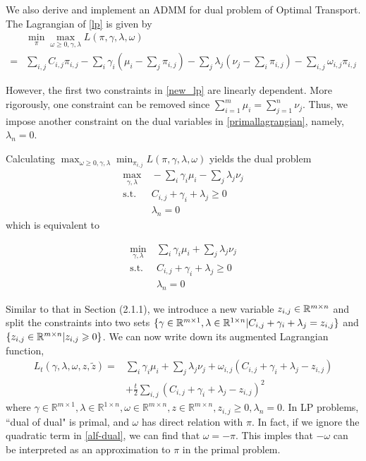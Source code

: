 \documentclass[english]{pkupaper}
\newenvironment{eqt}{\begin{equation}\begin{aligned}}{\end{aligned}\end{equation}}
\begin{document}
We also derive and implement an ADMM for dual problem of Optimal Transport. The Lagrangian of \ref{lp} is given by
\begin{eqt}
&\min_{\pi}\max_{\omega\geqslant 0, \gamma, \lambda}L(\pi, \gamma, \lambda, \omega) \\
= &  \sum_{i, j}C_{i,j}\pi_{i,j} - \sum_i\gamma_i(\mu_i-\sum_{j}\pi_{i,j}) - \sum_j\lambda_j(\nu_j-\sum_i\pi_{i,j}) - \sum_{i, j}\omega_{i,j}\pi_{i,j}\label{primallagrangian}
\end{eqt} 

However, the first two constraints in \ref{new_lp} are linearly dependent. More rigorously, one constraint can be removed since $\sum_{i=1}^m\mu_i = \sum_{j=1}^n\nu_j$. Thus, we impose another constraint on the dual variables in \ref{primallagrangian}, namely, $\lambda_n=0$. 

Calculating $\max_{\omega\geqslant 0, \gamma, \lambda}\min_{\pi_{i, j}}L(\pi, \gamma, \lambda, \omega)$ yields the dual problem
\begin{eqt}
\max_{\gamma, \lambda}&\ -\sum_i\gamma_i\mu_i - \sum_j\lambda_j\nu_j \\
\text{s.t.}&\ C_{i, j}+\gamma_i+\lambda_j\geqslant 0 \\
&\ \lambda_{n} = 0 \label{dual}
\end{eqt}
which is equivalent to 

\begin{eqt}
\min_{\gamma, \lambda}&\ \sum_i\gamma_i\mu_i + \sum_j\lambda_j\nu_j \\
\text{s.t.}&\ C_{i, j}+\gamma_i+\lambda_j\geqslant 0 \\
&\ \lambda_n=0 \label{dual2}
\end{eqt}

Similar to that in Section (2.1.1), we introduce a new variable $ z_{i, j} \in \mathbb{R}^{m\times n}$ and split the constraints into two sets $\{\gamma\in \mathbb{R}^{m\times 1}, \lambda\in \mathbb{R}^{1\times n}| C_{i, j}+\gamma_i+\lambda_j=z_{i, j}\}$ and $\{z_{i, j}\in \mathbb{R}^{m\times n}|z_{i, j}\geqslant0\}$. We can now write down its augmented Lagrangian function,
\begin{eqt}
L_t(\gamma, \lambda, \omega, z, \tilde z) = &\sum_i\gamma_i\mu_i + \sum_j\lambda_j\nu_j + \omega_{i, j}(C_{i, j}+\gamma_i+\lambda_j-z_{i, j}) \\&+ \frac{t}{2}\sum_{i, j}(C_{i, j}+\gamma_i+\lambda_j-z_{i, j})^2
\label{alf-dual}
\end{eqt}
where $\gamma\in\mathbb{R}^{m\times 1}, \lambda\in\mathbb{R}^{1\times n}, \omega\in\mathbb{R}^{m\times n}, z\in\mathbb{R}^{m\times n}, z_{i,j}\geqslant 0, \lambda_n=0$. In LP problems, ``dual of dual" is primal, and $\omega$ has direct relation with $\pi$. In fact, if we ignore the quadratic term in \ref{alf-dual}, we can find that $\omega = -\pi$. This imples that $-\omega$ can be interpreted as an approximation to $\pi$ in the primal problem.
\end{document}
